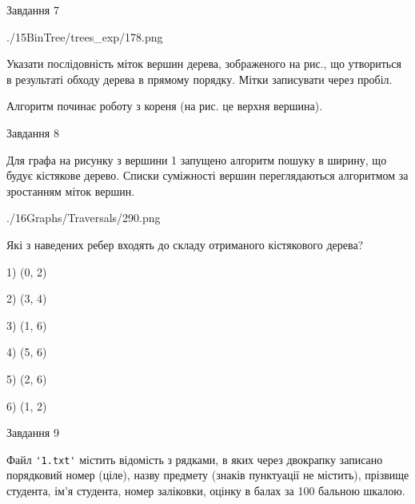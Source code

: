 \documentclass[12pt, ukrainian]{article}
\def\code#1{\Verb!#1!}
\begin{document}
{\newpage
\begin{minipage}[t]{9.7cm}
               
{\begin{center}Завдання {7}\end{center}}
\vspace{-6mm}

\begin{center}
	{./15BinTree/trees_exp/178.png}
\end{center}
Указати послідовність міток вершин дерева, зображеного на рис., що утвориться в результаті обходу дерева в прямому порядку. Мітки записувати через пробіл.\par Алгоритм починає роботу з кореня (на рис. це верхня вершина).\par

\end{minipage}
\vline \hspace{8mm}
\begin{minipage}[t]{8.0cm}
               
{\begin{center}Завдання {8}\end{center}}
\vspace{-6mm}
Для графа на рисунку з вершини 1 запущено алгоритм пошуку в ширину, що будує кістякове дерево. Списки суміжності вершин переглядаються алгоритмом за зростанням міток вершин.\par
\begin{center}
	{./16Graphs/Traversals/290.png}
\end{center}
\par Які з наведених ребер входять до складу отриманого кістякового дерева?\par
1) (0, 2)\par
2) (3, 4)\par
3) (1, 6)\par
4) (5, 6)\par
5) (2, 6)\par
6) (1, 2)\par
{\vskip 15pt} \par

\end{minipage}

               
{\begin{center}Завдання {9}\end{center}}
\vspace{-6mm}
Файл \code{'1.txt'} містить відомість з рядками, в яких через двокрапку записано поряд\-ковий номер (ціле), назву предмету (знаків пунктуації не містить), прізвище студента, ім'я студента, номер заліковки, оцінку в балах за 100 бальною шкалою.

}
\end{document}
